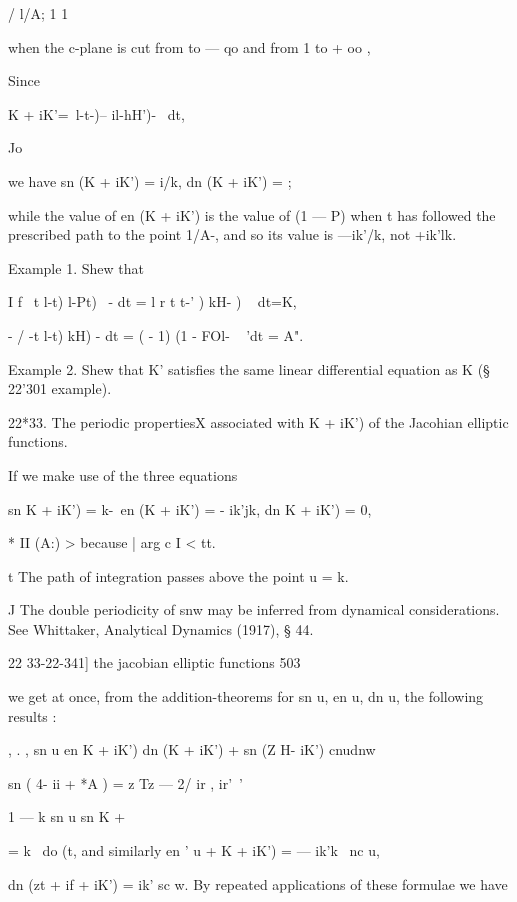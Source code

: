/ l/A; 1 1 



when the c-plane is cut from to — qo and from 1 to + oo , 



Since 



K + iK'=\  l-t-)-- il-hH')- ~dt, 

Jo 



we have sn (K + iK') = i/k, dn (K + iK') = ; 

while the value of en (K + iK') is the value of (1 — P)  when t has followed 
the prescribed path to the point 1/A-, and so its value is —ik'/k, not +ik'lk. 

Example 1. Shew that 

I f   \ t l-t) l-Pt) ~- dt = l r  t t-' ) kH- )  ~ dt=K, 

- /  -t l-t)   kH)  -  dt =      (  - 1) (1 - FOl- ~ 'dt = A". 

Example 2. Shew that K' satisfies the same linear differential equation as K (§ 22'301 
example). 

22*33. The periodic propertiesX  associated with K + iK') of the Jacohian 
elliptic functions. 

If we make use of the three equations 

sn  K + iK') = k-\ en (K + iK') = - ik'jk, dn  K + iK') = 0, 

* II (A:) > because | arg c I < tt. 

t The path of integration passes above the point u = k. 

J The double periodicity of snw may be inferred from dynamical considerations. See 
Whittaker, Analytical Dynamics (1917), § 44. 



22 33-22-341] the jacobian elliptic functions 503 

we get at once, from the addition-theorems for sn u, en u, dn u, the following 
results : 

,  .  ,  sn u en  K + iK') dn (K + iK') + sn (Z H- iK') cnudnw 

sn (   4- ii + *A ) = z Tz — 2/ ir ,  ir'\ '  

  1 — k  sn  u sn   K +%

= k~  do (t, 
and similarly en ' u + K + iK') = — ik'k~  nc u, 

dn (zt + if + iK') = ik' sc w. 
By repeated applications of these formulae we have 

